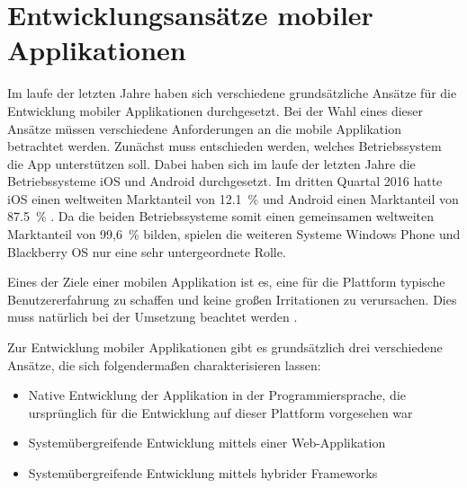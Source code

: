 \chapter{Entwicklungsansätze mobiler Applikationen}
\label{chap:entwicklungsansaetze}
%
%
Im laufe der letzten Jahre haben sich verschiedene grundsätzliche Ansätze für die Entwicklung mobiler Applikationen durchgesetzt. Bei der Wahl eines dieser Ansätze müssen verschiedene Anforderungen an die mobile Applikation betrachtet werden. Zunächst muss entschieden werden, welches Betriebssystem die App unterstützen soll. Dabei haben sich im laufe der letzten Jahre die Betriebssysteme iOS und Android durchgesetzt. Im dritten Quartal 2016 hatte iOS einen weltweiten Marktanteil von 12.1~\% und Android einen Marktanteil von 87.5~\% \cite{strategyAnalyticsMarktanteile}. Da die beiden Betriebssysteme somit einen gemeinsamen weltweiten Marktanteil von 99,6~\%  bilden, spielen die weiteren Systeme Windows Phone und Blackberry OS nur eine sehr untergeordnete Rolle.

Eines der Ziele einer mobilen Applikation ist es, eine für die Plattform typische Benutzererfahrung zu schaffen und keine großen Irritationen zu verursachen. Dies muss natürlich bei der Umsetzung beachtet werden \cite{FrancisHybridApp}.

Zur Entwicklung mobiler Applikationen gibt es grundsätzlich drei verschiedene Ansätze, die sich folgendermaßen charakterisieren lassen:
\begin{itemize}
    \item Native Entwicklung der Applikation in der Programmiersprache, die ursprünglich für die Entwicklung auf dieser Plattform vorgesehen war
    \item Systemübergreifende Entwicklung mittels einer Web-Applikation
    \item Systemübergreifende Entwicklung mittels hybrider Frameworks
\end{itemize}
%
%
